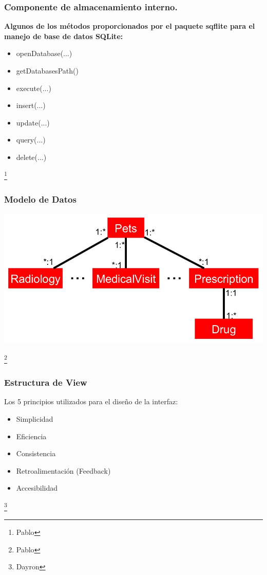 \documentclass[14pt]{beamer}
\begin{document}
\begin{frame}
\frametitle{Componente de almacenamiento interno.}

\textbf{Algunos de los métodos proporcionados por el paquete sqflite para el manejo de base de datos SQLite:}

\begin{itemize}


\item openDatabase(...)
\item getDatabasesPath()
\item execute(...)
\item insert(...)
\item update(...)
\item query(...)
\item delete(...)
\end{itemize}
\footnote{Pablo}
\end{frame}



\begin{frame}
\frametitle{Modelo de Datos}

\begin{center}

\includegraphics[scale =0.35]{Images/symplifiedClass.jpg}

\end{center}

\footnote{Pablo}
\end{frame}


\begin{frame}
\frametitle{Estructura de View}
Los 5 principios utilizados para el diseño de la interfaz:
\begin{itemize}
\item Simplicidad
\item Eficiencia
\item Consistencia
\item Retroalimentación (Feedback)
\item Accesibilidad
\end{itemize}
\footnote{Dayron}
\end{frame}
\end{document}
